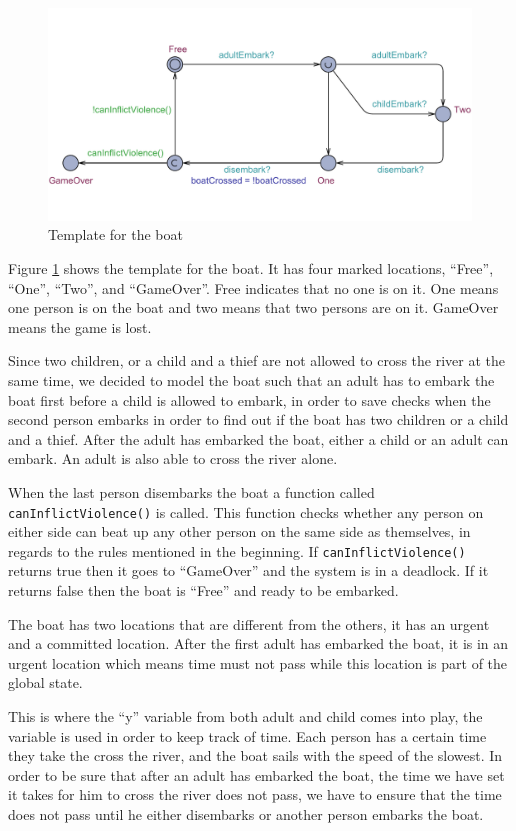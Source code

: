 \documentclass[a4paper,12pt]{article}
\begin{document}
\begin{figure}[H]
\centering
\includegraphics[width=\linewidth]{Boat.pdf}
\caption{Template for the boat}
\label{fig:boat}
\end{figure}

Figure \ref{fig:boat} shows the template for the boat. It has four marked locations, ``Free'', ``One'', ``Two'', and ``GameOver''. Free indicates that no one is on it. One means one person is on the boat and two means that two persons are on it. GameOver means the game is lost. 

Since two children, or a child and a thief are not allowed to cross the river at the same time, we decided to model the boat such that an adult has to embark the boat first before a child is allowed to embark, in order to save checks when the second person embarks in order to find out if the boat has two children or a child and a thief. After the adult has embarked the boat, either a child or an adult can embark. An adult is also able to cross the river alone. 

When the last person disembarks the boat a function called \lstinline|canInflictViolence()| is called. This function checks whether any person on either side can beat up any other person on the same side as themselves, in regards to the rules mentioned in the beginning. If \lstinline|canInflictViolence()| returns true then it goes to ``GameOver'' and the system is in a deadlock. If it returns false then the boat is ``Free'' and ready to be embarked.

The boat has two locations that are different from the others, it has an urgent and a committed location. After the first adult has embarked the boat, it is in an urgent location which means time must not pass while this location is part of the global state. 

This is where the ``y'' variable from both adult and child comes into play, the variable is used in order to keep track of time. Each person has a certain time they take the cross the river, and the boat sails with the speed of the slowest. In order to be sure that after an adult has embarked the boat, the time we have set it takes for him to cross the river does not pass, we have to ensure that the time does not pass until he either disembarks or another person embarks the boat.
\end{document}
